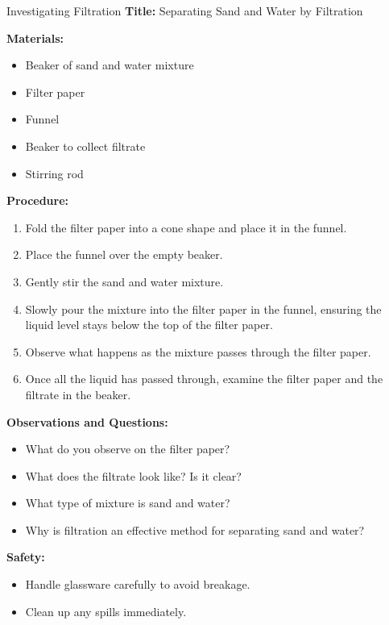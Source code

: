 \begin{investigation}{Investigating Filtration}
\textbf{Title:} Separating Sand and Water by Filtration

\textbf{Materials:}
\begin{itemize}
    \item Beaker of sand and water mixture
    \item Filter paper
    \item Funnel
    \item Beaker to collect filtrate
    \item Stirring rod
\end{itemize}

\textbf{Procedure:}
\begin{enumerate}
    \item Fold the filter paper into a cone shape and place it in the funnel.
    \item Place the funnel over the empty beaker.
    \item Gently stir the sand and water mixture.
    \item Slowly pour the mixture into the filter paper in the funnel, ensuring the liquid level stays below the top of the filter paper.
    \item Observe what happens as the mixture passes through the filter paper.
    \item Once all the liquid has passed through, examine the filter paper and the filtrate in the beaker.
\end{enumerate}

\textbf{Observations and Questions:}
\begin{itemize}
    \item What do you observe on the filter paper?
    \item What does the filtrate look like? Is it clear?
    \item What type of mixture is sand and water?
    \item Why is filtration an effective method for separating sand and water?
\end{itemize}

\textbf{Safety:}
\begin{itemize}
    \item Handle glassware carefully to avoid breakage.
    \item Clean up any spills immediately.
\end{itemize}
\end{investigation}


